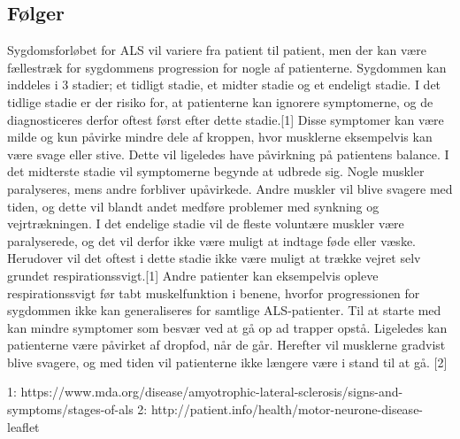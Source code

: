 \subsection{Følger}

Sygdomsforløbet for ALS vil variere fra patient til patient, men der kan være fællestræk for sygdommens progression for nogle af patienterne. Sygdommen kan inddeles i 3 stadier; et tidligt stadie, et midter stadie og et endeligt stadie. I det tidlige stadie er der risiko for, at patienterne kan ignorere symptomerne, og de diagnosticeres derfor oftest først efter dette stadie.[1] Disse symptomer kan være milde og kun påvirke mindre dele af kroppen, hvor musklerne eksempelvis kan være svage eller stive. Dette vil ligeledes have påvirkning på patientens balance. I det midterste stadie vil symptomerne begynde at udbrede sig. Nogle muskler paralyseres, mens andre forbliver upåvirkede. Andre muskler vil blive svagere med tiden, og dette vil blandt andet medføre problemer med synkning og vejrtrækningen. I det endelige stadie vil de fleste voluntære muskler være paralyserede, og det vil derfor ikke være muligt at indtage føde eller væske. Herudover vil det oftest i dette stadie ikke være muligt at trække vejret selv grundet respirationssvigt.[1] Andre patienter kan eksempelvis opleve respirationssvigt før tabt muskelfunktion i benene, hvorfor progressionen for sygdommen ikke kan generaliseres for samtlige ALS-patienter. Til at starte med kan mindre symptomer som besvær ved at gå op ad trapper opstå. Ligeledes kan patienterne være påvirket af dropfod, når de går. Herefter vil musklerne gradvist blive svagere, og med tiden vil patienterne ikke længere være i stand til at gå. [2] 


1: https://www.mda.org/disease/amyotrophic-lateral-sclerosis/signs-and-symptoms/stages-of-als 
2: http://patient.info/health/motor-neurone-disease-leaflet 
